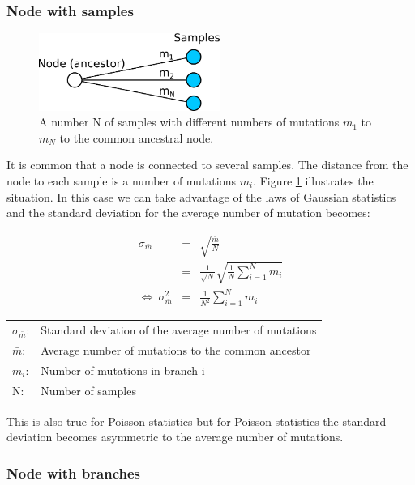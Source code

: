 \subsubsection*{Node with samples}

\begin{figure}[ht]
\centering
\includegraphics[width=5.9cm]{img/node_with_samples.png}
\caption{\label{node_with_samples} A number N of samples with different
numbers of mutations $m_1$ to $m_N$ to the common ancestral node.}
\end{figure}

It is common that a node is connected to several samples.
The distance from the node to each sample is a number of
mutations $m_i$. Figure \ref{node_with_samples} illustrates
the situation. In this case we can take advantage of the laws
of Gaussian statistics and the standard deviation for the
average number of mutation becomes:

\begin{eqnarray}
\sigma_{\bar{m}} & = & \sqrt{\frac{\bar{m}}{N}}\\
                 & = & \frac{1}{\sqrt{N}} \sqrt{\frac{1}{N} \sum_{i=1}^{N}m_i}\\
\Leftrightarrow\ \sigma_{\bar{m}}^2 & = & \frac{1}{N^2} \sum_{i=1}^{N}m_i
\end{eqnarray}

\begin{tabular}{ll}
$\sigma_{\bar{m}}$: &  Standard deviation of the average number of mutations\\
$\bar{m}$: & Average number of mutations to the common ancestor\\
$m_i$: &  Number of mutations in branch i\\
N: &  Number of samples
\end{tabular}
\vspace{1em}

This is also true for Poisson statistics but for Poisson
statistics the standard deviation becomes asymmetric to
the average number of mutations.


\subsubsection*{Node with branches}

